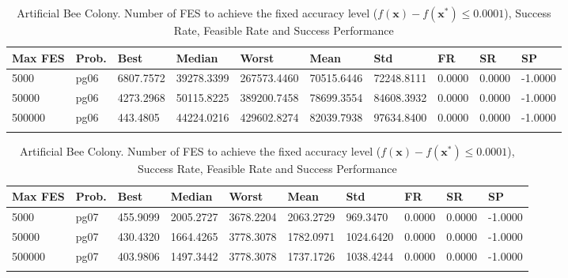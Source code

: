 \documentclass[10pt, a4paper]{book}
\begin{document}
\begin{center}
\begin{longtable}{l l l l l l l l l l}
\textbf{Max FES} & \textbf{Prob.} & \textbf{Best} & \textbf{Median} & \textbf{Worst} & \textbf{Mean} & \textbf{Std} & \textbf{FR} & \textbf{SR} & \textbf{SP} \\
\hline
5000 & pg06 & 6807.7572 & 39278.3399 & 267573.4460 & 70515.6446 & 72248.8111 & 0.0000 & 0.0000 & -1.0000 \\
50000 & pg06 & 4273.2968 & 50115.8225 & 389200.7458 & 78699.3554 & 84608.3932 & 0.0000 & 0.0000 & -1.0000 \\
500000 & pg06 & 443.4805 & 44224.0216 & 429602.8274 & 82039.7938 & 97634.8400 & 0.0000 & 0.0000 & -1.0000 \\

\caption{ Artificial Bee Colony. Number of FES to achieve the fixed accuracy level ($f(\mathbf{x}) - f(\mathbf{x}^{*}) \leq 0.0001$), Success Rate, Feasible Rate and Success Performance }
\end{longtable}
\end{center}

\begin{center}
\begin{longtable}{l l l l l l l l l l}
\textbf{Max FES} & \textbf{Prob.} & \textbf{Best} & \textbf{Median} & \textbf{Worst} & \textbf{Mean} & \textbf{Std} & \textbf{FR} & \textbf{SR} & \textbf{SP} \\
\hline
5000 & pg07 & 455.9099 & 2005.2727 & 3678.2204 & 2063.2729 & 969.3470 & 0.0000 & 0.0000 & -1.0000 \\
50000 & pg07 & 430.4320 & 1664.4265 & 3778.3078 & 1782.0971 & 1024.6420 & 0.0000 & 0.0000 & -1.0000 \\
500000 & pg07 & 403.9806 & 1497.3442 & 3778.3078 & 1737.1726 & 1038.4244 & 0.0000 & 0.0000 & -1.0000 \\

\caption{ Artificial Bee Colony. Number of FES to achieve the fixed accuracy level ($f(\mathbf{x}) - f(\mathbf{x}^{*}) \leq 0.0001$), Success Rate, Feasible Rate and Success Performance }
\end{longtable}
\end{center}
\end{document}
